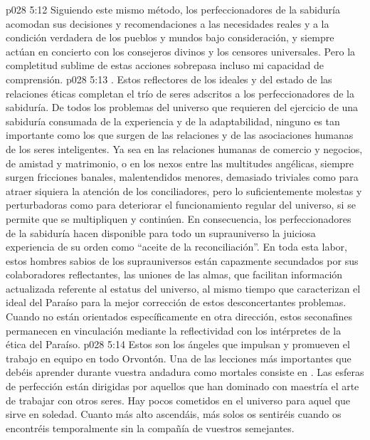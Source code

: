 \vs p028 5:12 Siguiendo este mismo método, los perfeccionadores de la sabiduría acomodan sus decisiones y recomendaciones a las necesidades reales y a la condición verdadera de los pueblos y mundos bajo consideración, y siempre actúan en concierto con los consejeros divinos y los censores universales. Pero la completitud sublime de estas acciones sobrepasa incluso mi capacidad de comprensión.
\vs p028 5:13 . Estos reflectores de los ideales y del estado de las relaciones éticas completan el trío de seres adscritos a los perfeccionadores de la sabiduría. De todos los problemas del universo que requieren del ejercicio de una sabiduría consumada de la experiencia y de la adaptabilidad, ninguno es tan importante como los que surgen de las relaciones y de las asociaciones humanas de los seres inteligentes. Ya sea en las relaciones humanas de comercio y negocios, de amistad y matrimonio, o en los nexos entre las multitudes angélicas, siempre surgen fricciones banales, malentendidos menores, demasiado triviales como para atraer siquiera la atención de los conciliadores, pero lo suficientemente molestas y perturbadoras como para deteriorar el funcionamiento regular del universo, si se permite que se multipliquen y continúen. En consecuencia, los perfeccionadores de la sabiduría hacen disponible para todo un suprauniverso la juiciosa experiencia de su orden como “aceite de la reconciliación”. En toda esta labor, estos hombres sabios de los suprauniversos están capazmente secundados por sus colaboradores reflectantes, las uniones de las almas, que facilitan información actualizada referente al estatus del universo, al mismo tiempo que caracterizan el ideal del Paraíso para la mejor corrección de estos desconcertantes problemas. Cuando no están orientados específicamente en otra dirección, estos seconafines permanecen en vinculación mediante la reflectividad con los intérpretes de la ética del Paraíso.
\vs p028 5:14 \pc Estos son los ángeles que impulsan y promueven el trabajo en equipo en todo Orvontón. Una de las lecciones más importantes que debéis aprender durante vuestra andadura como mortales consiste en . Las esferas de perfección están dirigidas por aquellos que han dominado con maestría el arte de trabajar con otros seres. Hay pocos cometidos en el universo para aquel que sirve en soledad. Cuanto más alto ascendáis, más solos os sentiréis cuando os encontréis temporalmente sin la compañía de vuestros semejantes.
